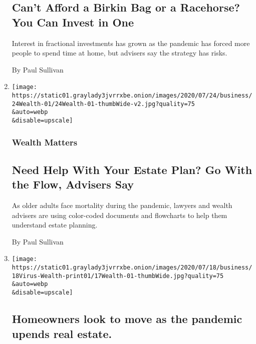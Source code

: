 \begin{enumerate}
  \hypertarget{cant-afford-a-birkin-bag-or-a-racehorse-you-can-invest-in-one}{%
  \subsection{Can't Afford a Birkin Bag or a Racehorse? You Can Invest
  in
  One}\label{cant-afford-a-birkin-bag-or-a-racehorse-you-can-invest-in-one}}

  Interest in fractional investments has grown as the pandemic has
  forced more people to spend time at home, but advisers say the
  strategy has risks.

  By Paul Sullivan
\item
  \href{/2020/07/24/your-money/need-help-with-your-estate-plan-go-with-the-flow-advisers-say.html}{}

  \texttt{[image: https://static01.graylady3jvrrxbe.onion/images/2020/07/24/business/24Wealth-01/24Wealth-01-thumbWide-v2.jpg?quality=75\\\&auto=webp\\\&disable=upscale]}

  \hypertarget{wealth-matters-3}{%
  \subsubsection{Wealth Matters}\label{wealth-matters-3}}

  \hypertarget{need-help-with-your-estate-plan-go-with-the-flow-advisers-say}{%
  \subsection{Need Help With Your Estate Plan? Go With the Flow,
  Advisers
  Say}\label{need-help-with-your-estate-plan-go-with-the-flow-advisers-say}}

  As older adults face mortality during the pandemic, lawyers and wealth
  advisers are using color-coded documents and flowcharts to help them
  understand estate planning.

  By Paul Sullivan
\item
  \href{/live/2020/07/20/business/stock-market-today-coronavirus/homeowners-look-to-move-as-the-pandemic-upends-real-estate}{}

  \texttt{[image: https://static01.graylady3jvrrxbe.onion/images/2020/07/18/business/18Virus-Wealth-print01/17Wealth-01-thumbWide.jpg?quality=75\\\&auto=webp\\\&disable=upscale]}

  \hypertarget{homeowners-look-to-move-as-the-pandemic-upends-real-estate}{%
  \subsection{Homeowners look to move as the pandemic upends real
  estate.}\label{homeowners-look-to-move-as-the-pandemic-upends-real-estate}}


\end{enumerate}
